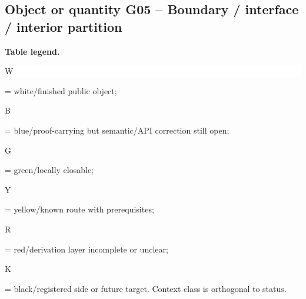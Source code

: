 \subsection*{Object or quantity G05 -- Boundary /\allowbreak{} interface /\allowbreak{} interior partition}
\hypertarget{objproof:G05}{}
\par\smallskip\noindent\begin{minipage}{0.99\linewidth}\footnotesize\raggedright\textbf{Table legend.} \colorbox{white}{\strut W} = white/finished public object; \colorbox{cyan!20}{\strut B} = blue/proof-carrying but semantic/API correction still open; \colorbox{green!18}{\strut G} = green/locally closable; \colorbox{yellow!25}{\strut Y} = yellow/known route with prerequisites; \colorbox{red!20}{\strut R} = red/derivation layer incomplete or unclear; \colorbox{black!18}{\strut K} = black/registered side or future target. Context class is orthogonal to status.\end{minipage}\par\vspace{0.25em}

